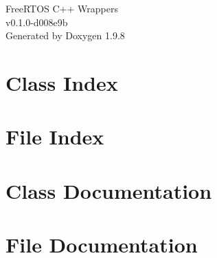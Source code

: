 \documentclass[twoside]{book}
\newcommand{\+}{\discretionary{\mbox{\scriptsize$\hookleftarrow$}}{}{}}
\newcommand{\clearemptydoublepage}{%
    \newpage{\pagestyle{empty}\cleardoublepage}%
  }
\begin{document}
  \raggedbottom
    \hypersetup{pageanchor=false,
                bookmarksnumbered=true,
                pdfencoding=unicode
               }
  \begin{titlepage}
  \vspace*{7cm}
  \begin{center}%
  {\Large Free\+RTOS C++ Wrappers}\\
  [1ex]\large v0.\+1.\+0-\/d008e9b \\
  \vspace*{1cm}
  {\large Generated by Doxygen 1.9.8}\\
  \end{center}
  \end{titlepage}
  \clearemptydoublepage
  \tableofcontents
  \clearemptydoublepage
  \hypersetup{pageanchor=true}

\chapter{Class Index}

\chapter{File Index}

\chapter{Class Documentation}


















\chapter{File Documentation}









\end{document}
